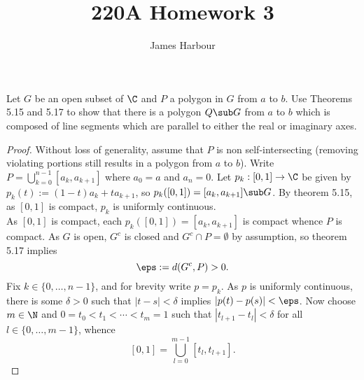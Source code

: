 \documentclass[12pt]{article}
\title{220A Homework 3}
\author{James Harbour}
\begin{document}
\maketitle

\begin{homeworkProblem}
 Let $ G $ be an open subset of $ \C $ and $ P $ a polygon in $ G $ from $ a $ to $ b $. Use Theorems 5.15 and 5.17 to show that there is a polygon $ Q\sub G $ from $ a $ to $ b $ which is composed of line segments which are parallel to either the real or imaginary axes.

 \begin{proof}
   Without loss of generality, assume that $ P $ is non self-intersecting (removing violating portions still results in a polygon from $ a $ to $ b $). Write $ P = \bigcup_{k=0}^{n-1} [a_{k}, a_{k+1}] $ where $ a_{0} = a $ and $ a_{n} = 0 $. Let $ p_{k}:[0,1] \to \C $ be given by $ p_{k}(t) := (1-t)a_{k} + ta_{k+1} $, so $ p_{k}([0,1]) = [a_{k},a_{k+1}] \sub G $.  By theorem  5.15, as $ [0,1] $  is compact, $ p_{k } $ is uniformly continuous. \\

   As $ [0,1] $ is compact, each $ p_{k}([0,1]) = [a_{k}, a_{k+1}] $ is compact whence $ P $ is compact. As $ G $ is open, $ G^{c} $ is closed and $ G^{c}\cap P = \emptyset $ by assumption, so theorem 5.17 implies 
   \[
     \eps := d(G^{c},P) >0.
   \]
   Fix $ k\in \{0,\ldots, n-1\} $, and for brevity write $ p=p_{k} $. As $ p $ is uniformly continuous, there is some $ \delta>0 $ such that $ |t-s| < \delta $ implies $ |p(t) - p(s)| < \eps $. Now choose $ m\in \N $  and $ 0 = t_{0}< t_{1} < \cdots < t_{m} = 1  $ such that $ |t_{l+1}- t_{l}| < \delta $ for all $ l\in \{0, \ldots, m-1\} $, whence 
   \[
     [0,1] = \bigcup_{l=0}^{m-1} [t_{l},t_{l+1}].
   \]


\end{proof}
\end{homeworkProblem}
\end{document}
